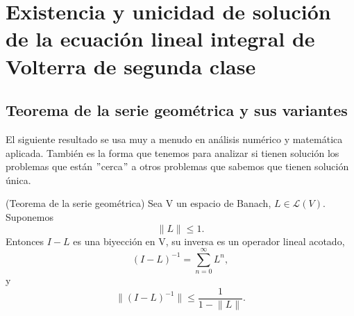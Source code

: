 \chapter{Existencia y unicidad de solución de la ecuación lineal integral de Volterra de segunda clase}
\section{Teorema de la serie geométrica y sus variantes}
El siguiente resultado se usa muy a menudo en análisis numérico y matemática aplicada. También es la forma que tenemos para analizar si tienen solución los problemas que están $"$cerca$"$ a otros problemas que sabemos que tienen solución única.
\begin{teorema}
	(Teorema de la serie geométrica) Sea V un espacio de Banach, $L \in \mathcal{L}(V)$. Suponemos
	\begin{equation}
		\lVert L \rVert \leq 1.
	\end{equation}
	Entonces $I - L$ es una biyección en V, su inversa es un operador lineal acotado,
	\begin{equation}
		(I-L)^{-1} = \sum_{n=0}^{\infty}L^n,
	\end{equation}
	y
	\begin{equation}\label{eq:teo1}
		\lVert (I-L)^{-1} \rVert \leqslant \dfrac{1}{1 - \lVert L \rVert}.
	\end{equation}
\end{teorema}
